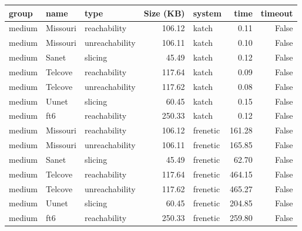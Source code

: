 \begin{tabular}{lllrlrr}
\toprule
group & name & type & Size (KB) & system & time & timeout \\
\midrule
medium & Missouri & reachability & 106.12 & katch & 0.11 & False \\
medium & Missouri & unreachability & 106.11 & katch & 0.10 & False \\
medium & Sanet & slicing & 45.49 & katch & 0.12 & False \\
medium & Telcove & reachability & 117.64 & katch & 0.09 & False \\
medium & Telcove & unreachability & 117.62 & katch & 0.08 & False \\
medium & Uunet & slicing & 60.45 & katch & 0.15 & False \\
medium & ft6 & reachability & 250.33 & katch & 0.12 & False \\
medium & Missouri & reachability & 106.12 & frenetic & 161.28 & False \\
medium & Missouri & unreachability & 106.11 & frenetic & 165.85 & False \\
medium & Sanet & slicing & 45.49 & frenetic & 62.70 & False \\
medium & Telcove & reachability & 117.64 & frenetic & 464.15 & False \\
medium & Telcove & unreachability & 117.62 & frenetic & 465.27 & False \\
medium & Uunet & slicing & 60.45 & frenetic & 204.85 & False \\
medium & ft6 & reachability & 250.33 & frenetic & 259.80 & False \\
\bottomrule
\end{tabular}
